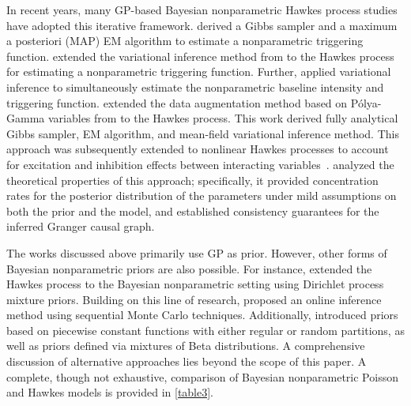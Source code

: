 \documentclass[10pt]{article} %
\begin{document}
In recent years, many GP-based Bayesian nonparametric Hawkes process studies have adopted this iterative framework. 
\citet{zhang2019efficient} derived a Gibbs sampler and a maximum a posteriori (MAP) EM algorithm to estimate a nonparametric triggering function.  
\citet{zhang2020variational} extended the variational inference method from \citet{lloyd2015variational} to the Hawkes process for estimating a nonparametric triggering function.  
Further, \citet{zhou2021em} applied variational inference to simultaneously estimate the nonparametric baseline intensity and triggering function. 
\citet{zhou2020auxiliary,malem2022variational} extended the data augmentation method based on P\'{o}lya-Gamma variables from \citet{donner2018efficient} to the Hawkes process. This work derived fully analytical Gibbs sampler, EM algorithm, and mean-field variational inference method. 
This approach was subsequently extended to nonlinear Hawkes processes to account for excitation and inhibition effects between interacting variables~\citep{zhou2022efficient}. 
\citet{sulem2024bayesian} analyzed the theoretical properties of this approach; specifically, it provided concentration rates for the posterior distribution of the parameters under mild assumptions on both the prior and the model, and established consistency guarantees for the inferred Granger causal graph. 


The works discussed above primarily use GP as prior. However, other forms of Bayesian nonparametric priors are also possible. 
For instance, \citet{markwick2020bayesian, yin2022bayesian, jiang2025semiparametric} extended the Hawkes process to the Bayesian nonparametric setting using Dirichlet process mixture priors. Building on this line of research, \citet{worrall2024online} proposed an online inference method using sequential Monte Carlo techniques. Additionally, \citet{donnet2020nonparametric} introduced priors based on piecewise constant functions with either regular or random partitions, as well as priors defined via mixtures of Beta distributions. A comprehensive discussion of alternative approaches lies beyond the scope of this paper. 
A complete, though not exhaustive, comparison of Bayesian nonparametric Poisson and Hawkes models is provided in \cref{table3}. 
\end{document}
